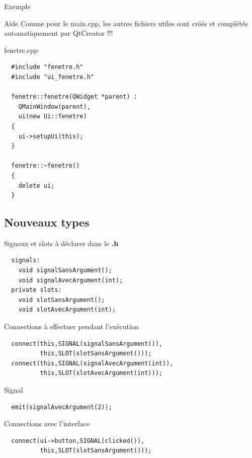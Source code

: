 \documentclass{beamer}
\begin{document}
\begin{frame}[fragile]{Exemple}

  \begin{scriptsize}
  
  \begin{block}{Aide}
  Comme pour le main.cpp, les autres fichiers utiles sont créés et complétés automatiquement par QtCreator !!!
  \end{block}
    \begin{block}{fenetre.cpp}
\begin{verbatim}
  #include "fenetre.h"
  #include "ui_fenetre.h"

  fenetre::fenetre(QWidget *parent) :
    QMainWindow(parent),
    ui(new Ui::fenetre)
  {
    ui->setupUi(this);
  }

  fenetre::~fenetre()
  {
    delete ui;
  }
\end{verbatim}
    \end{block}
  \end{scriptsize}
\end{frame}

\subsection*{Nouveaux types}

\begin{frame}[fragile]%

  \begin{scriptsize}
    \begin{block}{Signaux et slots à déclarer dans le {\bf .h}}
\begin{verbatim}
  signals:
    void signalSansArgument();
    void signalAvecArgument(int);
  private slots:
    void slotSansArgument();
    void slotAvecArgument(int);
\end{verbatim}
    \end{block}

    \begin{block}{Connections à effectuer pendant l'exécution}
\begin{verbatim}
  connect(this,SIGNAL(signalSansArgument()),
          this,SLOT(slotSansArgument()));
  connect(this,SIGNAL(signalAvecArgument(int)),
          this,SLOT(slotAvecArgument(int)));
\end{verbatim}
    \end{block}
    
    \begin{block}{Signal}
\begin{verbatim}
  emit(signalAvecArgument(2));
\end{verbatim}    
    \end{block}

    \begin{block}{Connections avec l'interface}
\begin{verbatim}
  connect(ui->button,SIGNAL(clicked()),
          this,SLOT(slotSansArgument()));
\end{verbatim}
    \end{block}
  \end{scriptsize}
\end{frame}
\end{document}
